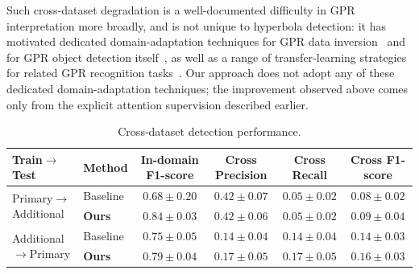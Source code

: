 \documentclass[lettersize,journal]{IEEEtran}
\begin{document}
Such cross-dataset degradation is a well-documented difficulty in GPR
interpretation more broadly, and is not unique to hyperbola detection: it has
motivated dedicated domain-adaptation techniques for GPR data
inversion~\cite{rw-gpr-uda} and for GPR object detection
itself~\cite{rw-gpr-da}, as well as a range of transfer-learning strategies for
related GPR recognition tasks~\cite{intro-tl-gpr1,intro-tl-gpr2,intro-tl-gpr3}.
Our approach does not adopt any of these dedicated domain-adaptation techniques;
the improvement observed above comes only from the explicit attention
supervision described earlier.


\begin{table}[]
\caption{Cross-dataset detection performance.}
\label{tab:cross-dataset}
\centering
\setlength{\tabcolsep}{4pt}
\begin{tabular}{llcccc}
\toprule
Train$\to$Test & Method & In-domain F1-score & Cross Precision & Cross Recall &
Cross F1-score \\
\midrule
\multirow{2}{*}{Primary$\to$Additional} & Baseline & $0.68 \pm 0.20$ & $0.42 \pm
0.07$ & $0.05 \pm 0.02$ & $0.08 \pm 0.02$ \\
 & \textbf{Ours} & $0.84 \pm 0.03$ & $\mathbf{0.42 \pm 0.06}$ & $\mathbf{0.05
 \pm 0.02}$ & $\mathbf{0.09 \pm 0.04}$ \\
\midrule
\multirow{2}{*}{Additional$\to$Primary} & Baseline & $0.75 \pm 0.05$ & $0.14 \pm
0.04$ & $0.14 \pm 0.04$ & $0.14 \pm 0.03$ \\
 & \textbf{Ours} & $0.79 \pm 0.04$ & $\mathbf{0.17 \pm 0.05}$ & $\mathbf{0.17
 \pm 0.05}$ & $\mathbf{0.16 \pm 0.03}$ \\
\bottomrule
\end{tabular}
\end{table}
\end{document}

